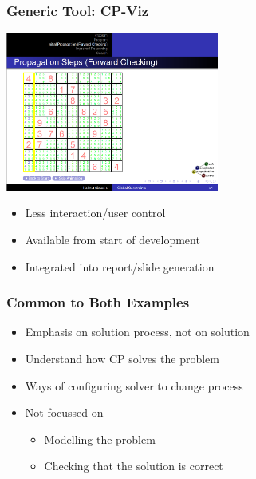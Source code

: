 \begin{frame}
\frametitle{Generic Tool: CP-Viz \cite{DBLP:conf/cp/SimonisDFMQC10}}
\includegraphics[width=7cm]{images/cpvizsudoku}
\begin{itemize}
\item Less interaction/user control
\item Available from start of development
\item Integrated into report/slide generation
\end{itemize}
\end{frame}

\begin{frame}
\frametitle{Common to Both Examples}
\begin{itemize}
\item Emphasis on solution process, not on solution
\item Understand how CP solves the problem
\item Ways of configuring solver to change process
\item Not focussed on 
\begin{itemize}
\item Modelling the problem
\item Checking that the solution is correct
\end{itemize}
\end{itemize}
\end{frame}

